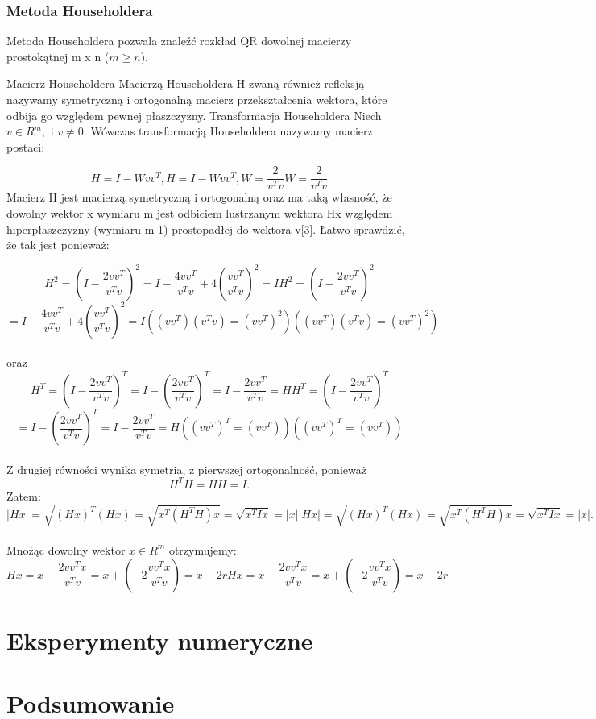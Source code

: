 \documentclass[10pt,a4paper]{report}
\begin{document}
\subsection*{Metoda Householdera}

Metoda Householdera pozwala znaleźć rozkład QR dowolnej macierzy prostokątnej m x n ($m\ge n$).

{Macierz Householdera}
Macierzą Householdera H zwaną również refleksją nazywamy symetryczną i ortogonalną macierz przekształcenia wektora, które odbija go względem pewnej płaszczyzny. 
\newpage
{Transformacja Householdera}
Niech  $v\in R^{m}, $ i $v\neq 0. $ Wówczas transformacją Householdera nazywamy macierz postaci:

$${\displaystyle H=I-Wvv^{T}, } {\displaystyle H=I-Wvv^{T}, }       {\displaystyle W={\frac {2}{v^{T}v}}} {\displaystyle W={\frac {2}{v^{T}v}}}$$ 
Macierz H jest macierzą symetryczną i ortogonalną oraz ma taką własność, że dowolny wektor x wymiaru m jest odbiciem lustrzanym wektora Hx względem hiperpłaszczyzny (wymiaru m-1) prostopadłej do wektora v[3]. Łatwo sprawdzić, że tak jest ponieważ: 

$${\displaystyle H^{2}=\left(I-{\frac {2vv^{T}}{v^{T}v}}\right)^{2}=I-{\frac {4vv^{T}}{v^{T}v}}+4\left({\frac {vv^{T}}{v^{T}v}}\right)^{2}=I} {\displaystyle H^{2}=\left(I-{\frac {2vv^{T}}{v^{T}v}}\right)^{2}}$$ \newline  $$= {I-{\frac {4vv^{T}}{v^{T}v}}+4\left({\frac {vv^{T}}{v^{T}v}}\right)^{2}=I}       {\displaystyle ((vv^{T})(v^{T}v)=(vv^{T})^{2})} {\displaystyle ((vv^{T})(v^{T}v)=(vv^{T})^{2})}$$\\
oraz\\

$${\displaystyle H^{T}=\left(I-{\frac {2vv^{T}}{v^{T}v}}\right)^{T}=I-\left({\frac {2vv^{T}}{v^{T}v}}\right)^{T}=I-{\frac {2vv^{T}}{v^{T}v}}=H} {\displaystyle H^{T}=\left(I-{\frac {2vv^{T}}{v^{T}v}}\right)^{T}}$$ \newline $$={I-\left({\frac {2vv^{T}}{v^{T}v}}\right)^{T}=I-{\frac {2vv^{T}}{v^{T}v}}=H}       {\displaystyle ((vv^{T})^{T}=(vv^{T}))} {\displaystyle ((vv^{T})^{T}=(vv^{T}))}$$\\
Z drugiej równości wynika symetria, z pierwszej ortogonalność, ponieważ $${\displaystyle H^{T}H=HH=I}. $$ Zatem:\\

$${\displaystyle |Hx|={\sqrt {(Hx)^{T}(Hx)}}={\sqrt {x^{T}(H^{T}H)x}}={\sqrt {x^{T}Ix}}=|x|} {\displaystyle |Hx|={\sqrt {(Hx)^{T}(Hx)}}={\sqrt {x^{T}(H^{T}H)x}}={\sqrt {x^{T}Ix}}=|x|}. $$\\
Mnożąc dowolny wektor ${\displaystyle x\in R^{m}}$ otrzymujemy:\\

$${\displaystyle Hx=x-{\frac {2vv^{T}x}{v^{T}v}}=x+(-2{\frac {vv^{T}x}{v^{T}v}})=x-2r} {\displaystyle Hx=x-{\frac {2vv^{T}x}{v^{T}v}}=x+(-2{\frac {vv^{T}x}{v^{T}v}})=x-2r}$$





\chapter{Eksperymenty numeryczne}

\chapter{Podsumowanie}
\end{document}
